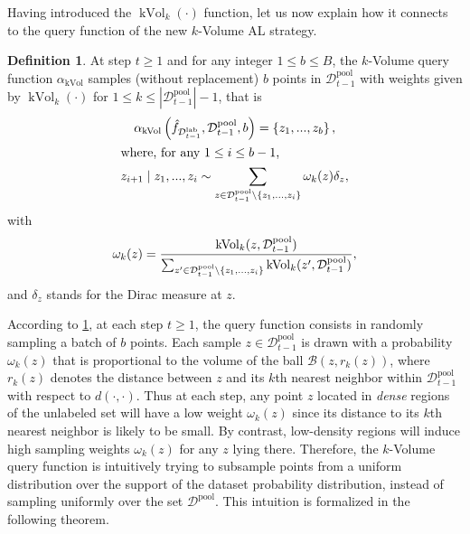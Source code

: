 \documentclass[twoside]{article}
\DeclareMathOperator{\kvol}{kVol}
\theoremstyle{definition}
\newtheorem{definition}{Definition}
\theoremstyle{remark}
\newcommand{\kvv}{z} %
\newcommand{\Dlab}{\mathcal{D}^{\mathrm{lab}}}
\newcommand{\Dpool}{\mathcal{D}^{\mathrm{pool}}}
\begin{document}
Having introduced the $\kvol_k(\cdot)$ function, let us now explain how it connects to the query function of the new $k$-Volume AL strategy.
%
\begin{definition}\label{def.KVol.query}
%
	At step $t\geq 1$ and for any integer $1\leq b\leq B$, the $k$-Volume query function $\alpha_{\kvol}$ samples (without replacement) $b$ points in $\Dpool_{t-1}$ with weights given by $\kvol_k(\cdot)$ for $ 1\leq k\leq |\Dpool_{t-1}|-1$, that is
    \begin{gather*}
        \alpha_{\kvol}\pa{\hat{f}_{\Dlab_{t-1}}, \Dpool_{t-1},b} = \set{\kvv_1,...,\kvv_b}, \\
        \intertext{where, for any $1\leq i\leq b-1$,}
        \kvv_{i+1} \mid \kvv_1,...,\kvv_i \sim \sum_{\kvv\in \Dpool_{t-1}\setminus \set{\kvv_1,\ldots,\kvv_i}} \omega_k(z) \delta_{\kvv},
    \end{gather*}
    with 
    \[\omega_k(\kvv) = \frac{\kvol_k(\kvv, \Dpool_{t-1})}{\sum_{\kvv^\prime \in \Dpool_{t-1}\setminus \set{\kvv_1,\ldots,\kvv_i}}  \kvol_k(\kvv^\prime,\Dpool_{t-1})},\] and $\delta_{\kvv}$ stands for the Dirac measure at $\kvv$.
\end{definition}
%
According to \cref{def.KVol.query}, at each step $t\geq 1$, the query function consists in randomly sampling a batch of $b$ points. Each sample $z\in \Dpool_{t-1}$ is drawn with a probability $\omega_k(z)$ that is proportional to the volume of the ball $\mathcal{B}(z,r_k(z))$, where $r_k(z)$ denotes the distance between $z$ and its $k$th nearest neighbor within $\Dpool_{t-1}$ with respect to $d(\cdot,\cdot)$. Thus at each step, any point $z$ located in \emph{dense} regions of the unlabeled set will have a low weight $\omega_k(z)$ since its distance to its $k$th nearest neighbor is likely to be small. By contrast, low-density regions will induce high sampling weights $\omega_k(z)$ for any $z$ lying there.
%
Therefore, the $k$-Volume query function is intuitively trying to subsample points from a uniform distribution over the support of the dataset probability distribution, instead of sampling uniformly over the set $\Dpool$. 
%
This intuition is formalized in the following theorem.
%
\end{document}
